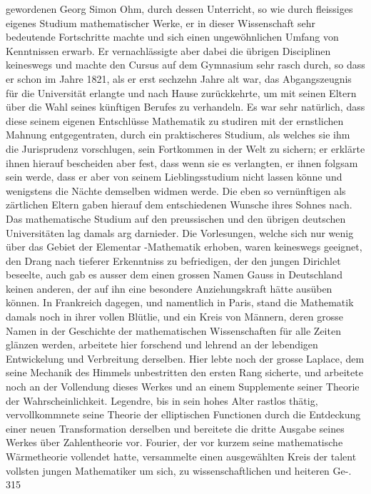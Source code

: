 \documentclass[11pt]{article}
\begin{document}
\noindent gewordenen Georg Simon Ohm, durch dessen Unterricht, so wie durch fleissiges eigenes Studium mathematischer Werke, er in dieser Wissenschaft sehr bedeutende Fortschritte machte und sich einen ungewöhnlichen Umfang von Kenntnissen erwarb. Er vernachlässigte aber dabei die übrigen Disciplinen keineswegs und machte den Cursus auf dem Gymnasium sehr rasch durch, so dass er schon im Jahre 1821, als er erst sechzehn Jahre alt war, das Abgangszeugnis für die Universität erlangte und nach Hause zurückkehrte, um mit seinen Eltern über die Wahl seines künftigen Berufes zu verhandeln. Es war sehr natürlich, dass diese seinem eigenen Entschlüsse Mathematik zu studiren mit der ernstlichen Mahnung entgegentraten, durch ein praktischeres Studium, als welches sie ihm die Jurisprudenz vorschlugen, sein Fortkommen in der Welt zu sichern; er erklärte ihnen hierauf bescheiden aber fest, dass wenn sie es verlangten, er ihnen folgsam sein werde, dass er aber von seinem Lieblingsstudium nicht lassen könne und wenigstens die Nächte demselben widmen werde. Die eben so vernünftigen als zärtlichen Eltern gaben hierauf dem entschiedenen Wunsche ihres Sohnes nach. Das mathematische Studium auf den preussischen und den übrigen deutschen Universitäten lag damals arg darnieder. Die Vorlesungen, welche sich nur wenig über das Gebiet der Elementar -Mathematik erhoben, waren keineswegs geeignet, den Drang nach tieferer Erkenntniss zu befriedigen, der den jungen Dirichlet beseelte, auch gab es ausser dem einen grossen Namen Gauss in Deutschland keinen anderen, der auf ihn eine besondere Anziehungskraft hätte ausüben können. In Frankreich dagegen, und namentlich in Paris, stand die Mathematik damals noch in ihrer vollen Blütlie, und ein Kreis von Männern, deren grosse Namen in der Geschichte der mathematischen Wissenschaften für alle Zeiten glänzen werden, arbeitete hier forschend und lehrend an der lebendigen Entwickelung und Verbreitung derselben. Hier lebte noch der grosse Laplace, dem seine Mechanik des Himmels unbestritten den ersten Rang sicherte, und arbeitete noch an der Vollendung dieses Werkes und an einem Supplemente seiner Theorie der Wahrscheinlichkeit. Legendre, bis in sein hohes Alter rastlos thätig, vervollkommnete seine Theorie der elliptischen Functionen durch die Entdeckung einer neuen Transformation derselben und bereitete die dritte Ausgabe seines Werkes über Zahlentheorie vor. Fourier, der vor kurzem seine mathematische Wärmetheorie vollendet hatte, versammelte einen ausgewählten Kreis der talent vollsten jungen Mathematiker um sich, zu wissenschaftlichen und heiteren Ge-. 315
\par
\end{document}
